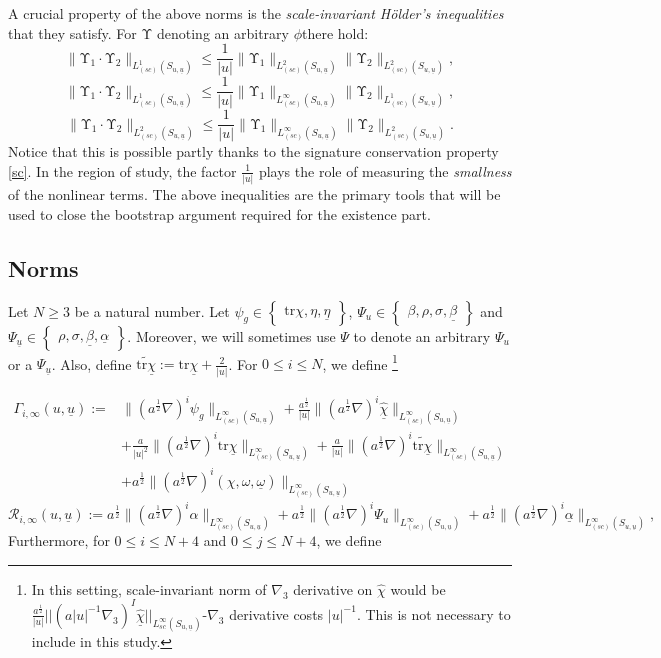 \documentclass{amsart}
\newcommand{\aln}{(\al \nabla)^i}
\newcommand{\omegabar}{\underline{\omega}}
\newcommand{\chihat}{\hat{\chi}}
\newcommand{\al}{a^{\frac{1}{2}}}
\newcommand{\chibar}{\underline{\chi}}
\newcommand{\chibarhat}{\underline{\hat{\chi}}}
\newcommand{\ubar}{\underline{u}}
\newcommand{\scaleinfinitySu}[1]{\lVert{#1} \rVert_{L^\infty_{(sc)}(S_{u,\ubar})}}
\newcommand{\tildetr}{\widetilde{\tr \chibar}}
\newcommand{\Y}{\mathrm{\Upsilon}}
\newcommand{\scaletwoSu}[1]{\lVert{#1} \rVert_{L^2_{(sc)}(S_{u,\ubar})}}
\newcommand{\scaleoneSu}[1]{\lVert{#1} \rVert_{L^1_{(sc)}(S_{u,\ubar})}}
\newcommand{\alphabar}{\underline{\alpha}}
\newcommand{\betabar}{\underline{\beta}}
\newcommand{\etabar}{\underline{\eta}}
\newcommand{\tr}{\mbox{tr}}
\begin{document}
{\noindent A crucial property of the above norms is the \textit{scale-invariant H\"older's inequalities} that they satisfy. For $\Y$ denoting an arbitrary $\phi$there hold:
\begin{equation}
\scaleoneSu{\Y_1 \cdot \Y_2} \leq \frac{1}{\lvert u \rvert} \scaletwoSu{\Y_1}\scaletwoSu{\Y_2},
\end{equation}
\begin{equation}
    \scaleoneSu{\Y_1 \cdot \Y_2} \leq \frac{1}{\lvert u \rvert} \scaleinfinitySu{\Y_1}\scaleoneSu{\Y_2},
\end{equation}
\begin{equation}
    \label{257}\scaletwoSu{\Y_1 \cdot \Y_2} \leq \frac{1}{\lvert u \rvert} \scaleinfinitySu{\Y_1}\scaletwoSu{\Y_2}.
\end{equation}Notice that this is possible partly thanks to the signature conservation property \eqref{sc}. In the region of study, the factor $\frac{1}{\lvert u\rvert}$ plays the role of measuring the \textit{smallness} of the nonlinear terms. The above inequalities are the primary tools that will be used to close the bootstrap argument required for the existence part.




\subsection{Norms}\label{Norms}
\noindent Let $N \geq 3$ be a natural number. Let $\psi_g \in \begin{Bmatrix}\tr\chi, \eta,\etabar \end{Bmatrix}$, $\Psi_u \in \begin{Bmatrix} \beta, \rho, \sigma,\betabar \end{Bmatrix}$ and $\Psi_{\ubar} \in \begin{Bmatrix} \rho, \sigma, \betabar, \alphabar \end{Bmatrix}$. Moreover, we will sometimes use $\Psi$ to denote an arbitrary $\Psi_u$ or a $\Psi_{\ubar}$. Also, define $\tildetr := \tr\chibar + \frac{2}{\lvert u\rvert}$. For $0\leq i \leq N$, we define \footnote{In this setting, scale-invariant norm of $\nabla_{3}$ derivative on $\chihat$ would be $\frac{a^{\frac{1}{2}}}{|u|} \bigg|\bigg|(a|u|^{-1}\nabla_{3})^{I}\chibarhat\bigg|\bigg|_{L^{\infty}_{sc}(S_{u,\ubar})}$-$\nabla_{3}$ derivative costs $|u|^{-1}$. This is not necessary to include in this study.}

\begin{align}
        \Gamma_{i,\infty}(u,\ubar) := & \scaleinfinitySu{\aln \psi_g} + \frac{a^{\frac{1}{2}}}{\lvert u \rvert} \scaleinfinitySu{\aln \chibarhat}\\ &+ \frac{a}{\lvert u \rvert^2}\scaleinfinitySu{\aln \tr\chibar} + \frac{a}{\lvert u \rvert} \scaleinfinitySu{\aln \tildetr}\\
        &+a^{\frac{1}{2}}\scaleinfinitySu{\aln (\chihat,\omega,\omegabar)}
 \end{align}
   \[ \mathcal{R}_{i, \infty}(u,\ubar) := a^{\frac{1}{2}}\scaleinfinitySu{\aln \alpha} + a^{\frac{1}{2}}\scaleinfinitySu{\aln \Psi_{u}}+a^{\frac{1}{2}}\scaleinfinitySu{\aln \alphabar},\] 
Furthermore, for $0\leq i \leq N+4$ and $0\leq j \leq N+4$, we define

}
\end{document}

